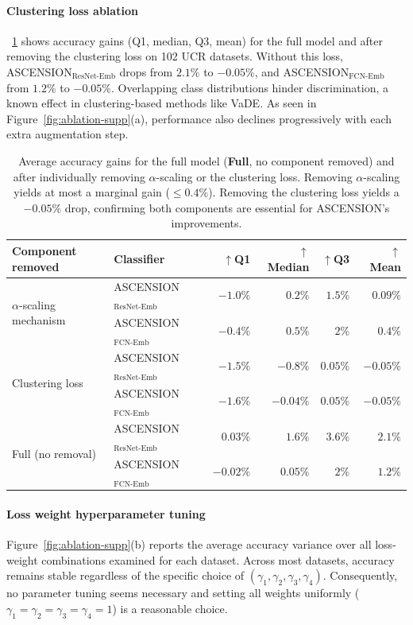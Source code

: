 \paragraph{Clustering loss ablation}
\tablename~\ref{tab:ablation} shows accuracy gains (Q1, median, Q3,
mean) for the full model and after removing the clustering loss on
102 UCR datasets. Without this loss,
ASCENSION$_{\text{ResNet-Emb}}$ drops from $2.1\%$ to $-0.05\%$,
and ASCENSION$_{\text{FCN-Emb}}$ from $1.2\%$ to $-0.05\%$.
Overlapping class distributions hinder discrimination, a known
effect in clustering-based methods like VaDE. As seen in
Figure~\ref{fig:ablation-supp}(a), performance also declines
progressively with each extra augmentation step.

\begin{table}[!htb]
\centering
\small
\caption{Average accuracy gains for the full model
(\textbf{Full}, no component removed) and after individually
removing $\alpha$-scaling or the clustering loss. Removing
$\alpha$-scaling yields at most a marginal gain ($\leq 0.4\%$). Removing the clustering loss yields a $-0.05\%$ drop,
confirming both components are essential for ASCENSION's
improvements.}
\label{tab:ablation}
\begin{tabular}{@{}llrrrr@{}}
\toprule
\textbf{Component removed} & \textbf{Classifier}
  & $\uparrow$Q1 & $\uparrow$Median & $\uparrow$Q3 & $\uparrow$Mean \\
\midrule
\multirow{2}{*}{$\alpha$-scaling mechanism}
  & ASCENSION$_{\text{ResNet-Emb}}$ & $-1.0\%$ & $0.2\%$  & $1.5\%$ & $0.09\%$ \\
  & ASCENSION$_{\text{FCN-Emb}}$    & $-0.4\%$ & $0.5\%$  & $2\%$   & $0.4\%$ \\
\midrule
\multirow{2}{*}{Clustering loss}
  & ASCENSION$_{\text{ResNet-Emb}}$ & $-1.5\%$ & $-0.8\%$ & $0.05\%$ & $-0.05\%$ \\
  & ASCENSION$_{\text{FCN-Emb}}$    & $-1.6\%$ & $-0.04\%$& $0.05\%$ & $-0.05\%$ \\
\midrule
\multirow{2}{*}{Full (no removal)}
  & ASCENSION$_{\text{ResNet-Emb}}$ & $0.03\%$ & $1.6\%$  & $3.6\%$  & $\mathbf{2.1\%}$ \\
  & ASCENSION$_{\text{FCN-Emb}}$    & $-0.02\%$& $0.05\%$ & $2\%$    & $\mathbf{1.2\%}$ \\
\bottomrule
\end{tabular}
\end{table}

\paragraph{Loss weight hyperparameter tuning}
Figure~\ref{fig:ablation-supp}(b) reports the average accuracy
variance over all loss-weight combinations examined for each
dataset. Across most datasets, accuracy remains stable regardless
of the specific choice of
$(\gamma_1, \gamma_2, \gamma_3, \gamma_4)$. Consequently, no
parameter tuning seems necessary and setting all weights
uniformly
($\gamma_1 = \gamma_2 = \gamma_3 = \gamma_4 = 1$) is a reasonable
choice.

